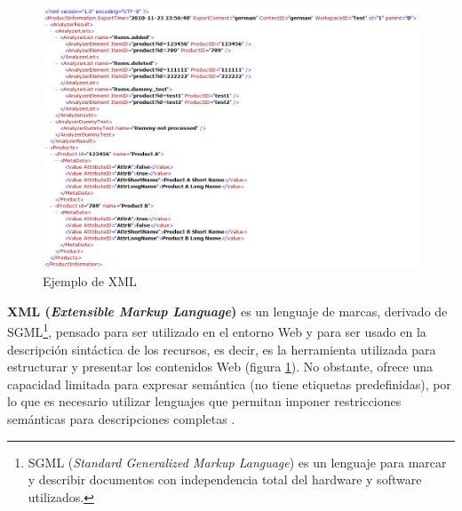 \begin{figure}[H]
	\centering
	\includegraphics[width=1\linewidth]{imagenes/capitulo3/1*kwUlHDYmt_TaWK7ZefEE8Q}
	\caption{Ejemplo de XML}
	\label{fig:1kwulhdymttawk7zefee8q}
\end{figure}

\textbf{XML (\textit{Extensible Markup Language})} es un lenguaje de marcas, derivado de SGML\footnote{SGML (\textit{Standard Generalized Markup Language}) es un lenguaje para marcar y describir documentos con independencia total del hardware y software utilizados.}, pensado para ser utilizado en el entorno Web y para ser usado en la descripción sintáctica de los recursos, es decir, es la herramienta utilizada para estructurar y presentar los contenidos Web (figura \ref{fig:1kwulhdymttawk7zefee8q}). No obstante, ofrece una capacidad limitada para expresar semántica (no tiene etiquetas predefinidas), por lo que es necesario utilizar lenguajes que permitan imponer restricciones semánticas para descripciones completas \cite{aplicacion}.








